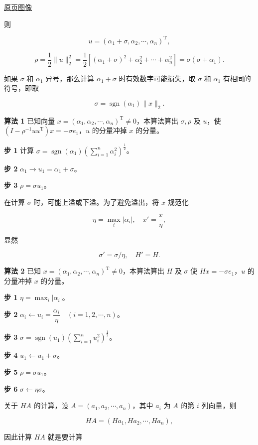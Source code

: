 \href{source-images/pdf-245.jpeg}{原页图像}

则

\[
u=(\alpha_1+\sigma,\alpha_2,\cdots,\alpha_n)^{\mathrm T},
\]

\[
\rho=\frac12\|u\|_2^2=\frac12\left[(\alpha_1+\sigma)^2+\alpha_2^2+\cdots+\alpha_n^2\right]=\sigma(\sigma+\alpha_1).
\]

如果 \(\sigma\) 和 \(\alpha_1\) 异号，那么计算 \(\alpha_1+\sigma\) 时有效数字可能损失，取 \(\sigma\) 和 \(\alpha_1\) 有相同的符号，即取

\[
\sigma=\operatorname{sgn}(\alpha_1)\|x\|_2.
\]

\textbf{算法 1} 已知向量 \(x=(\alpha_1,\alpha_2,\cdots,\alpha_n)^{\mathrm T}\ne0\)，本算法算出 \(\sigma,\rho\) 及 \(u\)，使 \((I-\rho^{-1}uu^{\mathrm T})x=-\sigma e_1\)，\(u\) 的分量冲掉 \(x\) 的分量。

\textbf{步 1} 计算 \(\sigma=\operatorname{sgn}(\alpha_1)\left(\displaystyle\sum_{i=1}^n\alpha_i^2\right)^{\frac12}\)。

\textbf{步 2} \(\alpha_1\to u_1=\alpha_1+\sigma\)。

\textbf{步 3} \(\rho=\sigma u_1\)。

在计算 \(\sigma\) 时，可能上溢或下溢。为了避免溢出，将 \(x\) 规范化

\[
\eta=\max_i|\alpha_i|,\quad x'=\frac{x}{\eta},
\]

显然

\[
\sigma'=\sigma/\eta,\quad H'=H.
\]

\textbf{算法 2} 已知 \(x=(\alpha_1,\alpha_2,\cdots,\alpha_n)^{\mathrm T}\ne0\)，本算法算出 \(H\) 及 \(\sigma\) 使 \(Hx=-\sigma e_1\)，\(u\) 的分量冲掉 \(x\) 的分量。

\textbf{步 1} \(\eta=\max_i|\alpha_i|\)。

\textbf{步 2} \(\alpha_i\leftarrow u_i=\dfrac{\alpha_i}{\eta}\quad(i=1,2,\cdots,n)\)。

\textbf{步 3} \(\sigma=\operatorname{sgn}(u_1)\left(\displaystyle\sum_{i=1}^nu_i^2\right)^{\frac12}\)。

\textbf{步 4} \(u_1\leftarrow u_1+\sigma\)。

\textbf{步 5} \(\rho=\sigma u_1\)。

\textbf{步 6} \(\sigma\leftarrow\eta\sigma\)。

关于 \(HA\) 的计算，设 \(A=(a_1,a_2,\cdots,a_n)\)，其中 \(a_i\) 为 \(A\) 的第 \(i\) 列向量，则

\[
HA=(Ha_1,Ha_2,\cdots,Ha_n),
\]

因此计算 \(HA\) 就是要计算

